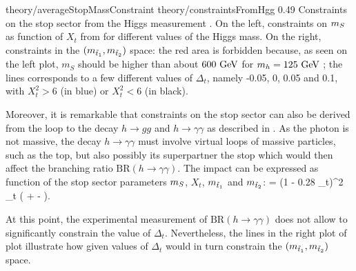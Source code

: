                     {theory/averageStopMassConstraint}
                     {theory/constraintsFromHgg}
                     {0.49}
                     {Constraints on the stop sector from the Higgs measurement
                     \cite{TheLightStopWindow}.  On the left, constraints on
                     $m_{S}$ as function of $X_t$ from for different values
                     of the Higgs mass. On the right, constraints in the
                     $(m_{\tilde{t}_1},m_{\tilde{t}_2})$ space: the red
                     area is forbidden because, as seen on the left plot, $m_S$
                     should be higher than about $600~\text{GeV}$ for $m_{h} =
                     125~\text{GeV}$ ; the lines corresponds to a few different values
                     of $\Delta_t$, namely -0.05, 0, 0.05 and 0.1, with $X_t^2 >
                     6$ (in blue) or $X_t^2 < 6$ (in black).  }

    Moreover, it is remarkable that constraints on the stop sector can also be
    derived from the loop to the decay $h \rightarrow gg$ and $h \rightarrow
    \gamma \gamma$ as described in \cite{TheLightStopWindow}. As the photon is
    not massive, the decay $h \rightarrow \gamma \gamma$ must involve virtual
    loops of massive particles, such as the top, but also possibly its
    superpartner the stop which would then affect the branching ratio
    $\text{BR}(h \rightarrow \gamma\gamma)$.  The impact can be expressed as
    function of the stop sector parameters $m_{S}$, $X_t$,
    $m_{\tilde{t}_1}$ and $m_{\tilde{t}_2}$:
    {
        =
        (1 - 0.28 \Delta_t)^2
        \hspace*{0.5cm}
        \hspace*{0.5cm}
        \Delta_t
        \approx
        \left(
            +
            -
        \right).
    }

    At this point, the experimental measurement of
    $\text{BR}(h\rightarrow\gamma\gamma)$ does not allow to significantly
    constrain the value of $\Delta_t$. Nevertheless, the lines in the right plot
    of  plot illustrate how given values of
    $\Delta_t$ would in turn constrain the
    $(m_{\tilde{t}_1},m_{\tilde{t}_2})$ space.

